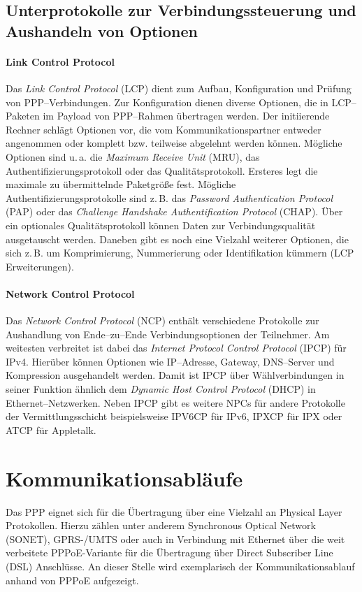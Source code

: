 \documentclass[journal,11pt]{IEEEtran}
\begin{document}
\subsection{Unterprotokolle zur Verbindungssteuerung und Aushandeln von Optionen}
\paragraph{Link Control Protocol}
Das \textit{Link Control Protocol} (LCP) dient zum Aufbau, Konfiguration und Prüfung von PPP--Verbindungen. Zur Konfiguration dienen diverse Optionen, die in LCP--Paketen im Payload von PPP--Rahmen übertragen werden. Der initiierende Rechner schlägt Optionen vor, die vom Kommunikationspartner entweder angenommen oder komplett bzw. teilweise abgelehnt werden können. Mögliche Optionen sind u.\,a. die \textit{Maximum Receive Unit} (MRU), das Authentifizierungsprotokoll oder das Qualitätsprotokoll. Ersteres legt die maximale zu übermittelnde Paketgröße fest. Mögliche Authentifizierungsprotokolle sind z.\,B. das \textit{Password Authentication Protocol} (PAP) oder das \textit{Challenge Handshake Authentification Protocol} (CHAP). Über ein optionales Qualitätsprotokoll können Daten zur Verbindungsqualität ausgetauscht werden. Daneben gibt es noch eine Vielzahl weiterer Optionen, die sich z.\,B. um Komprimierung, Nummerierung oder Identifikation kümmern (LCP Erweiterungen).
\paragraph{Network Control Protocol}
Das \textit{Network Control Protocol} (NCP) enthält verschiedene Protokolle zur Aushandlung von Ende--zu--Ende Verbindungsoptionen der Teilnehmer. Am weitesten verbreitet ist dabei das \textit{Internet Protocol Control Protocol} (IPCP) für IPv4. Hierüber können Optionen wie IP--Adresse, Gateway, DNS--Server und Kompression ausgehandelt werden. Damit ist IPCP über Wählverbindungen in seiner Funktion ähnlich dem \textit{Dynamic Host Control Protocol} (DHCP) in Ethernet--Netzwerken.
Neben IPCP gibt es weitere NPCs für andere Protokolle der Vermittlungsschicht beispielsweise IPV6CP für IPv6, IPXCP für IPX oder ATCP für Appletalk.
\\
%
\section{Kommunikationsabläufe}
Das PPP eignet sich für die Übertragung über eine Vielzahl an Physical Layer Protokollen.
Hierzu zählen unter anderem  Synchronous Optical Network (SONET), GPRS-/UMTS oder auch
in Verbindung mit Ethernet über die weit verbeitete PPPoE-Variante für die Übertragung
über Direct Subscriber Line (DSL) Anschlüsse\cite{IEEEhowto:kopka}.
An dieser Stelle wird exemplarisch der Kommunikationsablauf anhand von PPPoE aufgezeigt.
\end{document}
